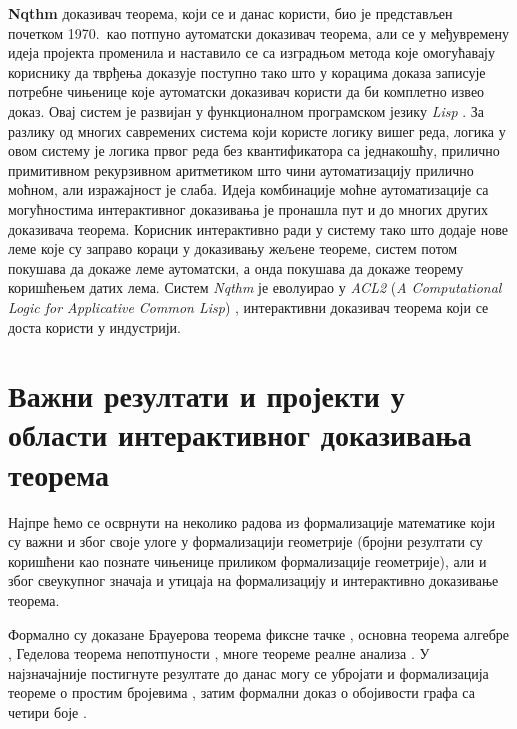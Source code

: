 \textbf{Nqthm} \cite{boyer-moore} доказивач теорема, који се и данас
користи, био је представљен почетком 1970.~као потпуно аутоматски
доказивач теорема, али се у међувремену идеја пројекта променила и
наставило се са изградњом метода које омогућавају кориснику да тврђења
доказује поступно тако што у корацима доказа записује потребне
чињенице које аутоматски доказивач користи да би комплетно извео
доказ. Овај систем је развијан у функционалном програмском језику
\emph{Lisp} \cite{lisp}. За разлику од многих савремених система који
користе логику вишег реда, логика у овом систему је логика првог реда
без квантификатора са једнакошћу, прилично примитивном рекурзивном
аритметиком што чини аутоматизацију прилично моћном, али изражајност
је слаба. Идеја комбинације моћне аутоматизације са могућностима
интерактивног доказивања је пронашла пут и до многих других доказивача
теорема. Корисник интерактивно ради у систему тако што додаје нове
леме које су заправо кораци у доказивању жељене теореме, систем потом
покушава да докаже леме аутоматски, а онда покушава да докаже теорему
коришћењем датих лема. Систем \emph{Nqthm} је еволуирао у \emph{ACL2}
(\emph{A Computational Logic for Applicative Common Lisp})
\cite{acl2}, интерактивни доказивач теорема који се доста користи у
индустрији.

\section{Важни резултати и пројекти у области интерактивног доказивања теорема}

Најпре ћемо се осврнути на неколико радова из формализације математике
који су важни и због своје улоге у формализацији геометрије (бројни
резултати су коришћени као познате чињенице приликом формализације
геометрије), али и због свеукупног значаја и утицаја на формализацију
и интерактивно доказивање теорема.

Формално су доказане Брауерова теорема фиксне тачке
\cite{harrison2013hol}, основна теорема алгебре
\cite{milewski2001fundamental, geuvers2000constructive}, Геделова
теорема непотпуности \cite{godel}, многе теореме реалне анализа
\cite{harrison2012theorem, cruz2002constructive}. У најзначајније
постигнуте резултате до данас могу се убројати и формализација теореме
о простим бројевима \cite{avigad2007PrimeNumber}, затим формални доказ
о обојивости графа са четири боје \cite{fourColorTheorem}.


